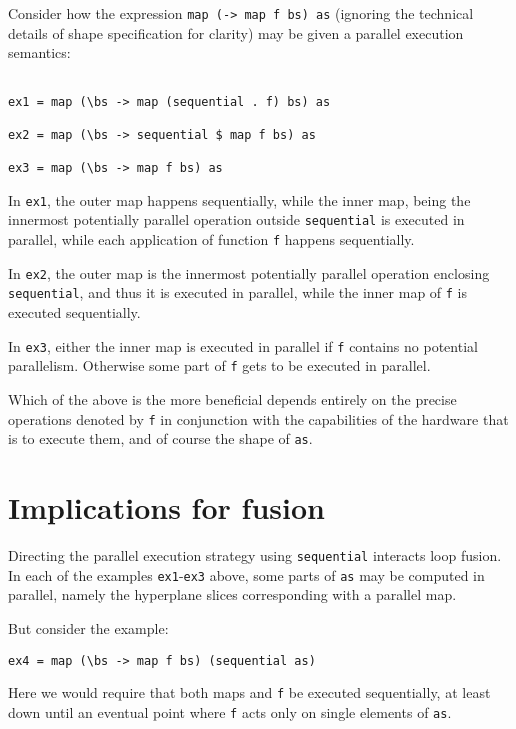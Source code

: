 Consider how the expression \texttt{map (\bs -> map f bs) as} (ignoring the
technical details of shape specification for clarity) may be given a parallel
execution semantics:

\begin{verbatim}

ex1 = map (\bs -> map (sequential . f) bs) as

ex2 = map (\bs -> sequential $ map f bs) as

ex3 = map (\bs -> map f bs) as

\end{verbatim}

In \texttt{ex1}, the outer map happens sequentially, while the inner map, being
the innermost potentially parallel operation outside \texttt{sequential} is
executed in parallel, while each application of function \texttt{f} happens
sequentially.

In \texttt{ex2}, the outer map is the innermost potentially parallel operation
enclosing \texttt{sequential}, and thus it is executed in parallel, while the
inner map of \texttt{f} is executed sequentially.

In \texttt{ex3}, either the inner map is executed in parallel if \texttt{f}
contains no potential parallelism. Otherwise some part of \texttt{f} gets to be
executed in parallel.

Which of the above is the more beneficial depends entirely on the precise
operations denoted by \texttt{f} in conjunction with the capabilities of the
hardware that is to execute them, and of course the shape of \texttt{as}.

\section{Implications for fusion}

Directing the parallel execution strategy using \texttt{sequential} interacts
loop fusion.  In each of the examples \texttt{ex1}-\texttt{ex3} above, some
parts of \texttt{as} may be computed in parallel, namely the hyperplane slices
corresponding with a parallel map.

But consider the example:
\begin{verbatim}
ex4 = map (\bs -> map f bs) (sequential as)
\end{verbatim}

Here we would require that both maps and \texttt{f} be executed sequentially,
at least down until an eventual point where \texttt{f} acts only on single
elements of \texttt{as}.

